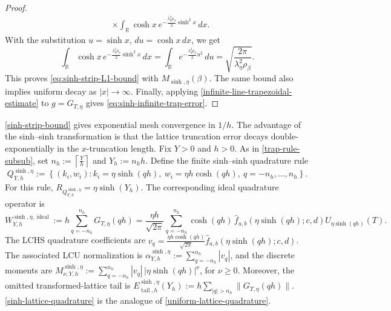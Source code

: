 \documentclass[10pt,reqno]{article}
\numberwithin{equation}{section}
\theoremstyle{plain}
\theoremstyle{definition}
\begin{document}
\begin{proof}
\begin{align}
& \times 
\int_{\mathbb R}\cosh x\,e^{-\frac{\lambda_\eta^2\rho_\beta}{2}\sinh^2x}\,dx.
\end{align}
With the substitution \(u=\sinh x\), \(du=\cosh x\,dx\), we get
\begin{equation}
\int_{\mathbb R}\cosh x\,e^{-\frac{\lambda_\eta^2\rho_\beta}{2}\sinh^2x}\,dx = \int_{\mathbb R}e^{-\frac{\lambda_\eta^2\rho_\beta}{2}u^2}\,du = \sqrt{\frac{2\pi}{\lambda_\eta^2\rho_\beta}}.
\end{equation}
This proves \cref{eq:sinh-strip-L1-bound} with \(M_{\operatorname{sinh},\eta}(\beta)\). The same bound also implies uniform decay as \(|x|\to\infty\). Finally, applying \cref{infinite-line-trapezoidal-estimate} to \(g=G_{T,\eta}\) gives \cref{eq:sinh-infinite-trap-error}.
\end{proof}

\cref{sinh-strip-bound} gives exponential mesh convergence in \(1/h\). The advantage of the sinh--sinh transformation is that the lattice truncation error decays double-exponentially in the \(x\)-truncation length. Fix \(Y>0\) and \(h>0\). As in \cref{trap-rule-subsub}, set $n_h := \left\lceil\frac{Y}{h}\right\rceil$ and $Y_h:=n_hh$.  Define the finite sinh--sinh quadrature rule
\begin{equation}\label{eq:sinh-Q-def}
Q_{Y,h}^{\operatorname{sinh},\eta} := \left\{(k_i,w_i): k_i=\eta\sinh(qh),\ w_i=\eta h\cosh(qh),\ q=-n_h,\ldots,n_h\right\}.
\end{equation}
For this rule, \(R_{Q_{Y,h}^{\operatorname{sinh},\eta}}=\eta\sinh(Y_h)\). 
The corresponding ideal quadrature operator is
\begin{equation}\label{eq:sinh-ideal-operator}
W_{Y,h}^{\operatorname{sinh},\eta,\operatorname{ideal}} := h\sum_{q=-n_h}^{n_h}G_{T,\eta}(qh) = \frac{\eta h}{\sqrt{2\pi}}\sum_{q=-n_h}^{n_h}\cosh(qh)\,\hat f_{a,b}(\eta\sinh(qh);c,d)U_{\eta\sinh(qh)}(T).
\end{equation}
The LCHS quadrature coefficients are \(v_q=\frac{\eta h\cosh(qh)}{\sqrt{2\pi}}\hat f_{a,b}(\eta\sinh(qh);c,d)\). The associated LCU normalization is \(\alpha_{Y,h}^{\operatorname{sinh},\eta}:=\sum_{q=-n_h}^{n_h}|v_q|\), and the discrete moments are \(M_{\nu,Y,h}^{\operatorname{sinh},\eta}:=\sum_{q=-n_h}^{n_h}|v_q|\,|\eta\sinh(qh)|^\nu\), for \(\nu\ge0\). Moreover, the omitted transformed-lattice tail is \(E_{\operatorname{tail},h}^{\operatorname{sinh},\eta}(Y_h):=h\sum_{|q|>n_h}\|G_{T,\eta}(qh)\|\).
\cref{sinh-lattice-quadrature} is the analogue of \cref{uniform-lattice-quadrature}. 
\end{document}
